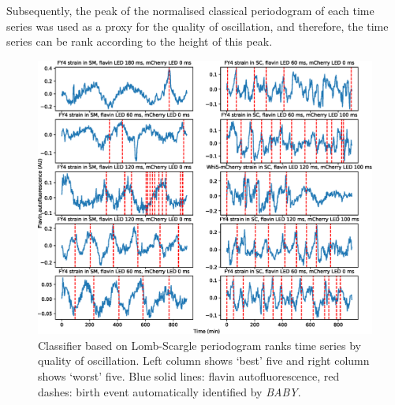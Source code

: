 Subsequently, the peak of the normalised classical periodogram of each time series was used as a proxy for the quality of oscillation, and therefore, the time series can be rank according to the height of this peak.


\begin{figure}[htbp]
  \centering
  \includegraphics[width=\textwidth]{10m_ClassifierBestWorstTS}
  \caption[
    Classifier based on Lomb-Scargle periodogram ranks time series by quality of oscillation
  ]{
    Classifier based on Lomb-Scargle periodogram ranks time series by quality of oscillation.
    Left column shows `best' five and right column shows `worst' five.
    Blue solid lines: flavin autofluorescence, red dashes: birth event automatically identified by \textit{BABY}.
  }
  \label{fig:ClassifierBestWorstTS}
\end{figure}


